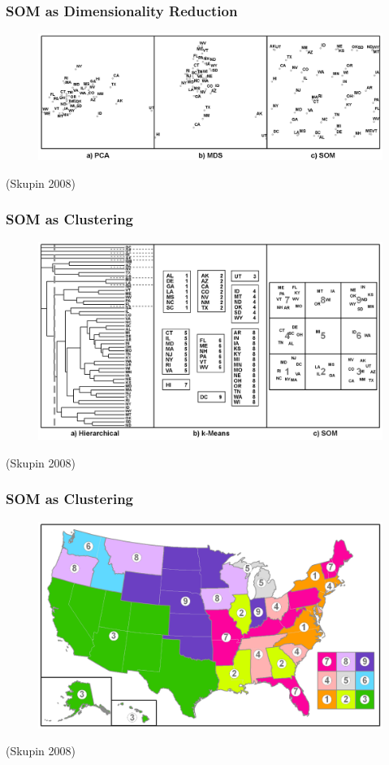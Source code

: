 \documentclass[nototal,handout]{beamer}
\begin{document}
\begin{frame}
	\frametitle{SOM as Dimensionality Reduction}
  \begin{center}
  \begin{figure}
  \includegraphics[width=0.90\linewidth]{dimensionReduction.png}
  \end{figure}
  \end{center}
  \vspace{1in} (Skupin 2008)
 \end{frame} 

\begin{frame}
	\frametitle{SOM as Clustering}
  \begin{center}
  \begin{figure}
  \includegraphics[width=0.90\linewidth]{clustering.png}
  \end{figure}
  \end{center}
  (Skupin 2008)
 \end{frame} 

\begin{frame}
	\frametitle{SOM as Clustering}
  \begin{center}
  \begin{figure}
  \includegraphics[width=0.90\linewidth]{clustermap.png}
  \end{figure}
  \end{center}
  (Skupin 2008)
 \end{frame} 
\end{document}
